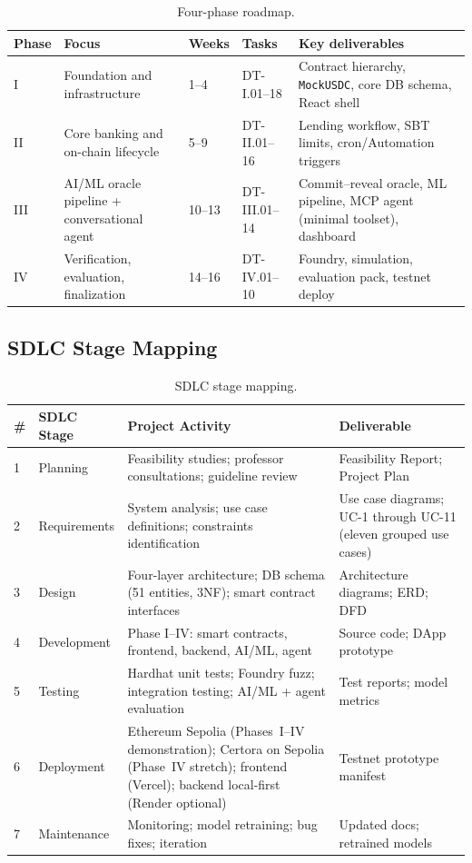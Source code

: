 \begin{table}[H]
\centering
\caption[Four-phase roadmap]{Four-phase roadmap.}
\label{tab:phase-roadmap}
\begin{tabular}{p{1.5cm}p{3.5cm}p{2cm}p{2cm}p{3cm}}
\toprule
\tableheadcolor
\textbf{Phase} & \textbf{Focus} & \textbf{Weeks} & \textbf{Tasks} & \textbf{Key deliverables} \\
\midrule
I & Foundation and infrastructure & 1--4 & DT-I.01--18 & Contract hierarchy, \texttt{MockUSDC}, core DB schema, React shell \\
II & Core banking and on-chain lifecycle & 5--9 & DT-II.01--16 & Lending workflow, SBT limits, cron/Automation triggers \\
III & AI/ML oracle pipeline + conversational agent & 10--13 & DT-III.01--14 & Commit--reveal oracle, ML pipeline, MCP agent (minimal toolset), dashboard \\
IV & Verification, evaluation, finalization & 14--16 & DT-IV.01--10 & Foundry, simulation, evaluation pack, testnet deploy \\
\bottomrule
\end{tabular}
\end{table}

\subsection{SDLC Stage Mapping}

\begin{table}[H]
\centering
\caption[SDLC stage mapping]{SDLC stage mapping.}
\label{tab:sdlc-mapping}
\begin{tabular}{p{0.5cm}p{2.5cm}p{4.5cm}p{5cm}}
\toprule
\tableheadcolor
\textbf{\#} & \textbf{SDLC Stage} & \textbf{Project Activity} & \textbf{Deliverable} \\
\midrule
1 & Planning & Feasibility studies; professor consultations; guideline review & Feasibility Report; Project Plan \\
2 & Requirements & System analysis; use case definitions; constraints identification & Use case diagrams; UC-1 through UC-11 (eleven grouped use cases) \\
3 & Design & Four-layer architecture; DB schema (51 entities, 3NF); smart contract interfaces & Architecture diagrams; ERD; DFD \\
4 & Development & Phase I--IV: smart contracts, frontend, backend, AI/ML, agent & Source code; DApp prototype \\
5 & Testing & Hardhat unit tests; Foundry fuzz; integration testing; AI/ML + agent evaluation & Test reports; model metrics \\
6 & Deployment & Ethereum Sepolia (Phases~I--IV demonstration); Certora on Sepolia (Phase~IV stretch); frontend (Vercel); backend local-first (Render optional) & Testnet prototype manifest \\
7 & Maintenance & Monitoring; model retraining; bug fixes; iteration & Updated docs; retrained models \\
\bottomrule
\end{tabular}
\end{table}




